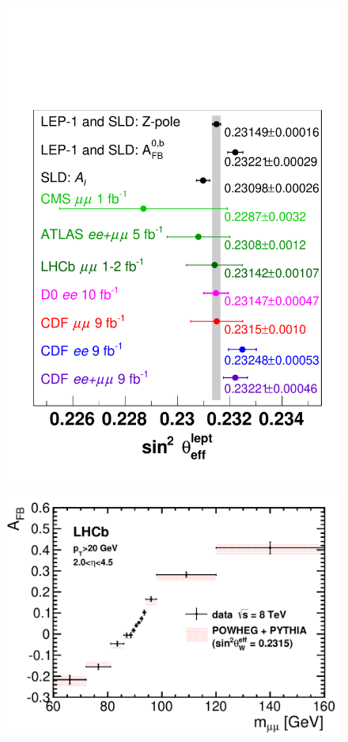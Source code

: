 \begin{figure}[p]
    \centering
    \includegraphics[height=0.3\textheight]{figures/ss-precision-summary-sin2thetaw.pdf}
    \caption{}
    \label{fig:ss-precision-summary-sin2thetaw}
\end{figure}

\begin{figure}[p]
    \centering
    \includegraphics[height=0.3\textheight]{figures/ss-precision-afb-lhcb.pdf}
    \caption{
    }
    \label{fig:ss-precision-afb-lhcb}
\end{figure}



